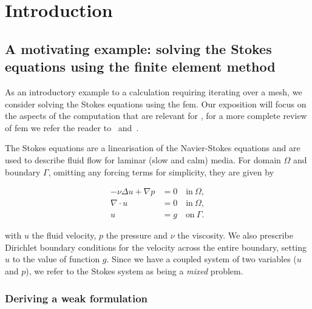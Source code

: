 \documentclass[thesis]{subfiles}
\begin{document}
\chapter{Introduction}
\label{chapter:introduction}


\section{A motivating example: solving the Stokes equations using the finite element method}
\label{sec:stokes_equations}

As an introductory example to a calculation requiring iterating over a mesh, we consider solving the Stokes equations using the \gls{fem}.
Our exposition will focus on the aspects of the computation that are relevant for , for a more complete review of \gls{fem} we refer the reader to~\cite{brennerMathematicalTheoryFinite2008} and~\cite{larsonFiniteElementMethod2013}.

The Stokes equations are a linearisation of the Navier-Stokes equations and are used to describe fluid flow for laminar (slow and calm) media.
For domain $\Omega$ and boundary $\Gamma$, omitting any forcing terms for simplicity, they are given by

\begin{subequations}
  \begin{align}
    - \nu \Delta u + \nabla p &= 0 \quad \textrm{in} \ \Omega, \\
    \nabla \cdot u &= 0 \quad \textrm{in} \ \Omega, \\
    u &= g \quad \textrm{on} \ \Gamma.
  \end{align}
  \label{eq:strong_stokes}
\end{subequations}

with $u$ the fluid velocity, $p$ the pressure and $\nu$ the viscosity.
We also prescribe Dirichlet boundary conditions for the velocity across the entire boundary, setting $u$ to the value of function $g$.
Since we have a coupled system of two variables ($u$ and $p$), we refer to the Stokes system as being a \textit{mixed} problem.

\subsection{Deriving a weak formulation}
\end{document}
